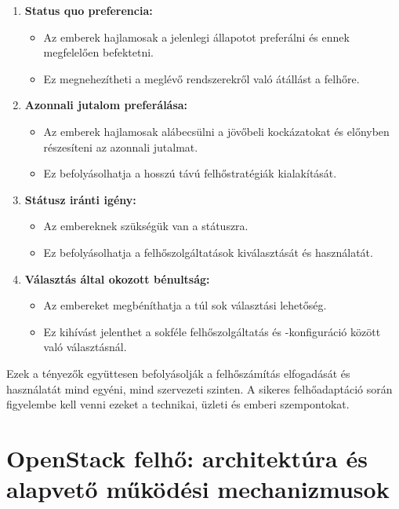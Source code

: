 \documentclass[a4paper,12pt]{article}
\begin{document}
\begin{enumerate}
        \item \textbf{Status quo preferencia:}
        \begin{itemize}
            \item Az emberek hajlamosak a jelenlegi állapotot preferálni és ennek megfelelően befektetni.
            \item Ez megnehezítheti a meglévő rendszerekről való átállást a felhőre.
        \end{itemize}

        \item \textbf{Azonnali jutalom preferálása:}
        \begin{itemize}
            \item Az emberek hajlamosak alábecsülni a jövőbeli kockázatokat és előnyben részesíteni az azonnali jutalmat.
            \item Ez befolyásolhatja a hosszú távú felhőstratégiák kialakítását.
        \end{itemize}

        \item \textbf{Státusz iránti igény:}
        \begin{itemize}
            \item Az embereknek szükségük van a státuszra.
            \item Ez befolyásolhatja a felhőszolgáltatások kiválasztását és használatát.
        \end{itemize}

        \item \textbf{Választás által okozott bénultság:}
        \begin{itemize}
            \item Az embereket megbéníthatja a túl sok választási lehetőség.
            \item Ez kihívást jelenthet a sokféle felhőszolgáltatás és -konfiguráció között való választásnál.
        \end{itemize}
    \end{enumerate}

    Ezek a tényezők együttesen befolyásolják a felhőszámítás elfogadását és használatát mind egyéni, mind szervezeti szinten. A sikeres felhőadaptáció során figyelembe kell venni ezeket a technikai, üzleti és emberi szempontokat.

    \newpage


    \section{OpenStack felhő: architektúra és alapvető működési mechanizmusok}
\end{document}
